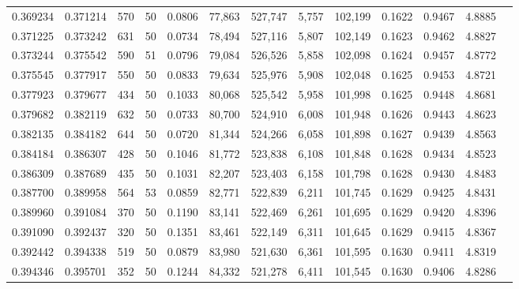 \begin{tabular}{rrrrrrrrrrrrr}
0.369234 & 0.371214 &   570 &  50 &                                     0.0806 &  77,863 & 527,747 &   5,757 & 102,199 & 0.1622 & 0.9467 & 4.8885 \\
0.371225 & 0.373242 &   631 &  50 &                                     0.0734 &  78,494 & 527,116 &   5,807 & 102,149 & 0.1623 & 0.9462 & 4.8827 \\
0.373244 & 0.375542 &   590 &  51 &                                     0.0796 &  79,084 & 526,526 &   5,858 & 102,098 & 0.1624 & 0.9457 & 4.8772 \\
0.375545 & 0.377917 &   550 &  50 &                                     0.0833 &  79,634 & 525,976 &   5,908 & 102,048 & 0.1625 & 0.9453 & 4.8721 \\
0.377923 & 0.379677 &   434 &  50 &                                     0.1033 &  80,068 & 525,542 &   5,958 & 101,998 & 0.1625 & 0.9448 & 4.8681 \\
0.379682 & 0.382119 &   632 &  50 &                                     0.0733 &  80,700 & 524,910 &   6,008 & 101,948 & 0.1626 & 0.9443 & 4.8623 \\
0.382135 & 0.384182 &   644 &  50 &                                     0.0720 &  81,344 & 524,266 &   6,058 & 101,898 & 0.1627 & 0.9439 & 4.8563 \\
0.384184 & 0.386307 &   428 &  50 &                                     0.1046 &  81,772 & 523,838 &   6,108 & 101,848 & 0.1628 & 0.9434 & 4.8523 \\
0.386309 & 0.387689 &   435 &  50 &                                     0.1031 &  82,207 & 523,403 &   6,158 & 101,798 & 0.1628 & 0.9430 & 4.8483 \\
0.387700 & 0.389958 &   564 &  53 &                                     0.0859 &  82,771 & 522,839 &   6,211 & 101,745 & 0.1629 & 0.9425 & 4.8431 \\
0.389960 & 0.391084 &   370 &  50 &                                     0.1190 &  83,141 & 522,469 &   6,261 & 101,695 & 0.1629 & 0.9420 & 4.8396 \\
0.391090 & 0.392437 &   320 &  50 &                                     0.1351 &  83,461 & 522,149 &   6,311 & 101,645 & 0.1629 & 0.9415 & 4.8367 \\
0.392442 & 0.394338 &   519 &  50 &                                     0.0879 &  83,980 & 521,630 &   6,361 & 101,595 & 0.1630 & 0.9411 & 4.8319 \\
0.394346 & 0.395701 &   352 &  50 &                                     0.1244 &  84,332 & 521,278 &   6,411 & 101,545 & 0.1630 & 0.9406 & 4.8286 \\

\end{tabular}
